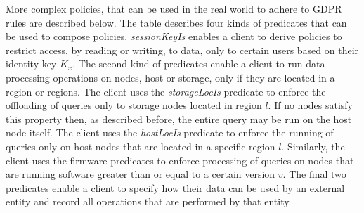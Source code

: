 \vspace{-2mm}
More complex policies, that can be used in the real world to adhere to GDPR rules are described below. %
The table describes four kinds of predicates that can be used to compose policies. \emph{sessionKeyIs} enables a client to derive policies to restrict access, by reading or writing, to data, only to certain users based on their identity key $K_ x$. The second kind of predicates enable a client to run data processing operations on nodes, host or storage, only if they are located in a region or regions. The client uses the \emph{storageLocIs} predicate to enforce the offloading of queries only to storage nodes located in region $l$. If no nodes satisfy this property then, as described before, the entire query may be run on the host node itself. The client uses the \emph{hostLocIs} predicate to enforce the running of queries only on host nodes that are located in a specific region $l$. Similarly, the client uses the firmware predicates to enforce processing of queries on nodes that are running software greater than or equal to a certain version $v$. The final two predicates enable a client to specify how their data can be used by an external entity and record all operations that are performed by that entity.







